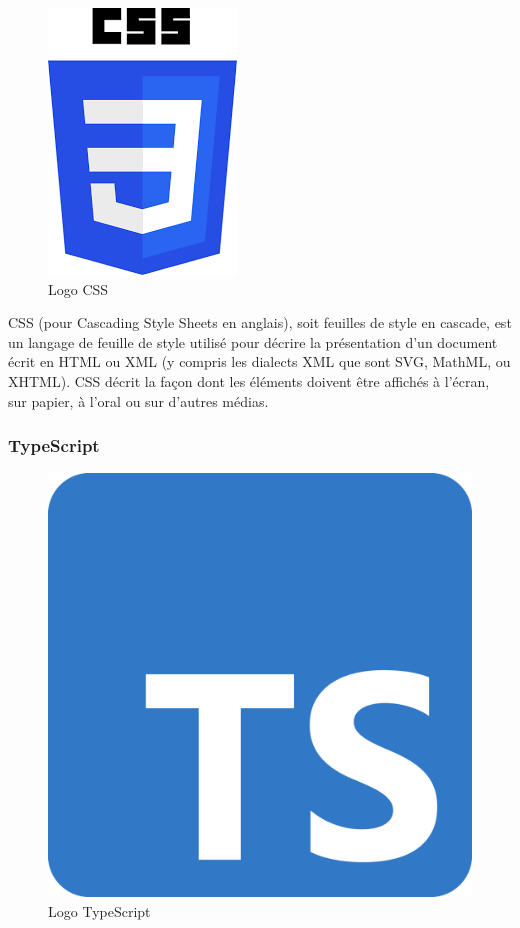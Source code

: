 \begin{figure}[H]
    \centering
    \includegraphics[scale=0.3]{Logos/css.png}
    \caption{Logo CSS}
\end{figure}

CSS (pour Cascading Style Sheets en anglais), soit feuilles de style en cascade, est un langage de feuille de style utilisé pour décrire la présentation d'un document écrit en HTML ou XML (y compris les dialects XML que sont SVG, MathML, ou XHTML). CSS décrit la façon dont les éléments doivent être affichés à l'écran, sur papier, à l'oral ou sur d'autres médias.

\subsubsection{TypeScript}

\begin{figure}[H]
    \centering
    \includegraphics[scale=0.05]{Logos/Typescript.png}
    \caption{Logo TypeScript}
\end{figure}

